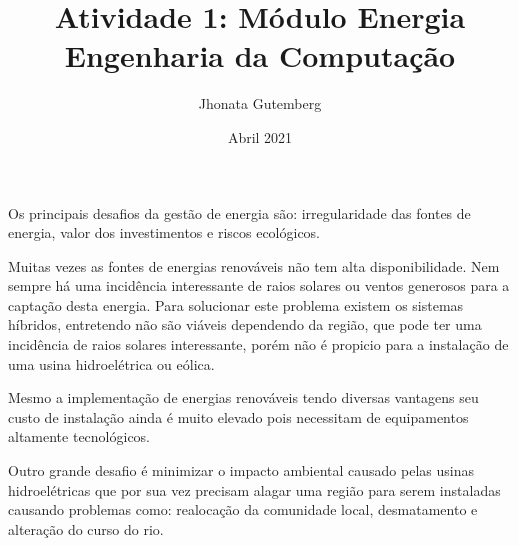 \documentclass[a4paper, 12pt]{article}
\title{
    Atividade 1: Módulo Energia \\
    \large Engenharia da Computação
}
\author{
    Jhonata Gutemberg
}
\date{Abril 2021}
\begin{document}
    \maketitle
    
    \par Os principais desafios da gestão de energia são: irregularidade das fontes de energia, valor dos investimentos e riscos ecológicos.
    
    \par Muitas vezes as fontes de energias renováveis não tem alta disponibilidade. Nem sempre há uma incidência interessante de raios solares ou ventos generosos para a captação desta energia. Para solucionar este problema existem os sistemas híbridos, entretendo não são viáveis dependendo da região, que pode ter uma incidência de raios solares interessante, porém não é propicio para a instalação de uma usina hidroelétrica ou eólica.

    \par Mesmo a implementação de energias renováveis tendo diversas vantagens seu custo de instalação ainda é muito elevado pois necessitam de equipamentos altamente tecnológicos.

    \par Outro grande desafio é minimizar o impacto ambiental causado pelas usinas hidroelétricas que por sua vez precisam alagar uma região para serem instaladas causando problemas como: realocação da comunidade local, desmatamento e alteração do curso do rio.
\end{document}
